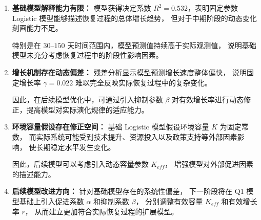 \documentclass[12pt,a4paper]{article}
\begin{document}
\begin{enumerate}

\item
\textbf{基础模型解释能力有限：}
模型获得决定系数 $R^2=0.532$，表明固定参数 Logistic 模型能够描述恢复过程的总体增长趋势，
但对于中期阶段的动态变化刻画能力不足。

特别是在 $30$--$150$ 天时间范围内，模型预测值持续高于实际观测值，
说明基础模型未充分考虑恢复过程中的阶段性影响因素。

\item
\textbf{增长机制存在动态偏差：}
残差分析显示模型预测增长速度整体偏快，
说明固定增长率 $\gamma=0.022$ 难以完全反映实际恢复过程中的复杂变化。

因此，在后续模型优化中，可通过引入抑制参数 $\beta$
对有效增长率进行动态修正，提高模型对实际演化规律的适应能力。

\item
\textbf{环境容量假设存在修正空间：}
基础 Logistic 模型假设环境容量 $K$ 为固定常数，
而实际系统可能受到技术提升、资源投入以及政策支持等外部因素影响，
使长期稳定水平发生变化。

因此，后续模型可以考虑引入动态容量参数 $K_{eff}$，
增强模型对外部促进因素的描述能力。

\item
\textbf{后续模型改进方向：}
针对基础模型存在的系统性偏差，
下一阶段将在 Q1 模型基础上引入促进系数 $\alpha$
和抑制系数 $\beta$，
分别调整有效容量 $K_{eff}$ 和有效增长率 $r$，
从而建立更加符合实际恢复过程的扩展模型。

\end{enumerate}
\end{document}
